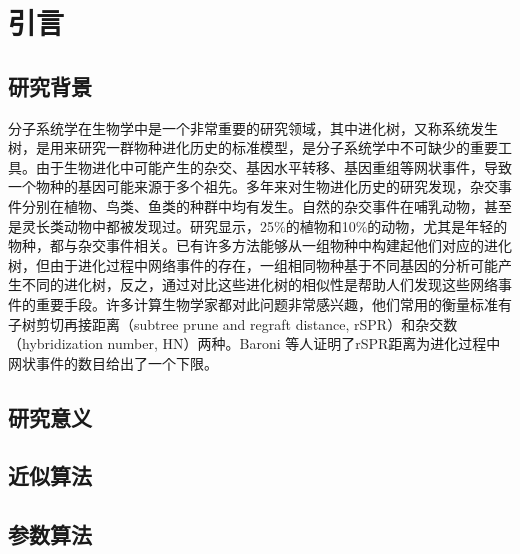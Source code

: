 
\chapter{引言}
\section{研究背景}
分子系统学在生物学中是一个非常重要的研究领域，其中进化树，又称系统发生树，是用来研究一群物种进化历史的标准模型，是分子系统学中不可缺少的重要工具。由于生物进化中可能产生的杂交、基因水平转移、基因重组等网状事件，导致一个物种的基因可能来源于多个祖先。多年来对生物进化历史的研究发现，杂交事件分别在植物、鸟类、鱼类的种群中均有发生。自然的杂交事件在哺乳动物，甚至是灵长类动物中都被发现过。研究显示，25\%的植物和10\%的动物，尤其是年轻的物种，都与杂交事件相关。已有许多方法能够从一组物种中构建起他们对应的进化树，但由于进化过程中网络事件的存在，一组相同物种基于不同基因的分析可能产生不同的进化树，反之，通过对比这些进化树的相似性是帮助人们发现这些网络事件的重要手段。许多计算生物学家都对此问题非常感兴趣，他们常用的衡量标准有子树剪切再接距离（subtree prune and regraft distance, rSPR）和杂交数（hybridization number, HN）两种。Baroni 等人证明了rSPR距离为进化过程中网状事件的数目给出了一个下限。

\section{研究意义}

\section{近似算法}

\section{参数算法}

